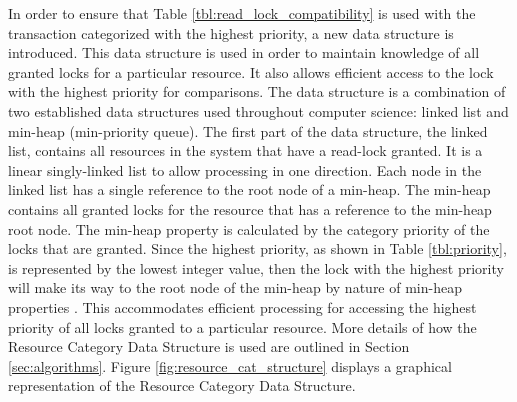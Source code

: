 In order to ensure that Table \ref{tbl:read_lock_compatibility} is used with the transaction categorized with the highest priority, a new data structure is introduced. This data structure is used in order to maintain knowledge of all granted locks for a particular resource. It also allows efficient access to the lock with the highest priority for comparisons. The data structure is a combination of two established data structures used throughout computer science: linked list and min-heap (min-priority queue). The first part of the data structure, the linked list, contains all resources in the system that have a read-lock granted. It is a linear singly-linked list to allow processing in one direction. Each node in the linked list has a single reference to the root node of a min-heap. The min-heap contains all granted locks for the resource that has a reference to the min-heap root node. The min-heap property is calculated by the category priority of the locks that are granted. Since the highest priority, as shown in Table \ref{tbl:priority}, is represented by the lowest integer value, then the lock with the highest priority will make its way to the root node of the min-heap by nature of min-heap properties \cite[p.162]{Cormen_Algorithms}. This accommodates efficient processing for accessing the highest priority of all locks granted to a particular resource. More details of how the Resource Category Data Structure is used are outlined in Section \ref{sec:algorithms}. Figure \ref{fig:resource_cat_structure} displays a graphical representation of the Resource Category Data Structure.


